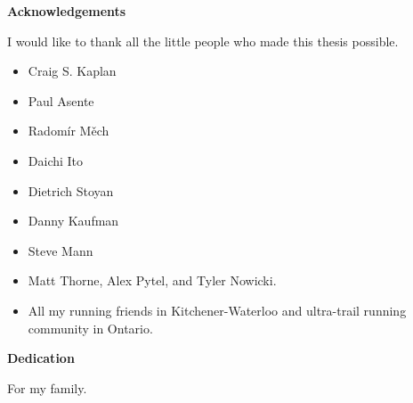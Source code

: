 
\cleardoublepage


\begin{center}\textbf{Acknowledgements}\end{center}

I would like to thank all the little people who made this thesis possible.


\begin{itemize}  
\item Craig S. Kaplan
\item Paul Asente 
\item Radom\'ir M\v{e}ch 
\item Daichi Ito
\item Dietrich Stoyan 
\item Danny Kaufman
\item Steve Mann
\item Matt Thorne, Alex Pytel, and Tyler Nowicki.
\item All my running friends in Kitchener-Waterloo and ultra-trail running community in Ontario. 
\end{itemize}

\cleardoublepage


\begin{center}\textbf{Dedication}\end{center}

For my family.
\cleardoublepage

\renewcommand\contentsname{Table of Contents}
\tableofcontents
\cleardoublepage
{}    %

\listoftables
\cleardoublepage
{}		%

\listoffigures
\cleardoublepage
{}		%

\printglossaries
\cleardoublepage
{}		%


